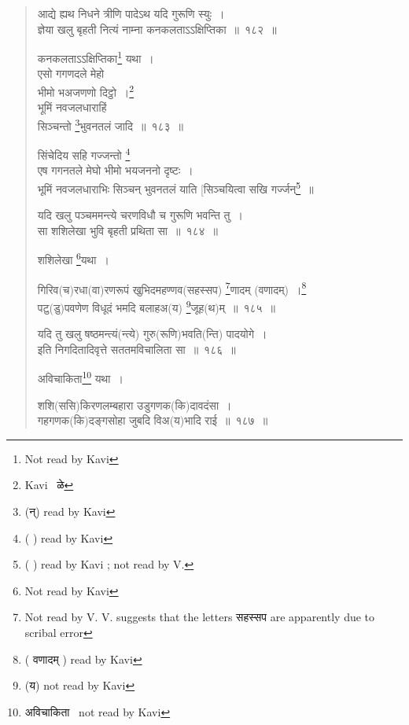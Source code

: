 \documentclass[11pt, openany]{book}
\begin{document}
\begin{quote}
{\na आद्ये ह्यथ निधने त्रीणि पादेऽथ यदि गुरूणि स्युः~।\\
ज्ञेया खलु बृहती नित्यं नाम्ना कनकलताऽऽक्षिप्तिका~॥~१८२~॥

कनकलताऽऽक्षिप्तिका\renewcommand{\thefootnote}{1}\footnote{Not read by Kavi} यथा~। \\
एसो गगणदले मेहो \\
भीमो भअजणणो दिट्ठो~।\renewcommand{\thefootnote}{2}\footnote{Kavi \textendash\ ळे}\\
भूमिं नवजलधाराहिं \\
सिञ्चन्तो \renewcommand{\thefootnote}{3}\footnote{(न्) read by Kavi}भुवनतलं जादि~॥~१८३~॥}

{\qt सिंचेदिय सहि गज्जन्तो \renewcommand{\thefootnote}{4}\footnote{( ) read by Kavi} \\
एष गगनतले मेघो भीमो भयजननो दृष्टः~। \\
भूमिं नवजलधाराभिः सिञ्चन् भुवनतलं याति [सिञ्चयित्वा सखि गर्ज्जन्\renewcommand{\thefootnote}{5}\footnote{( ) read by Kavi ; not read by V.}~॥}

{\na यदि खलु पञ्चममन्त्ये चरणविधौ च गुरूणि भवन्ति तु~। \\
सा शशिलेखा भुवि बृहती प्रथिता सा~॥~१८४~॥}

शशिलेखा \renewcommand{\thefootnote}{6}\footnote{Not read by Kavi}यथा~।

{\na गिरिव(च)रधा(वा)रणरूपं खुभिदमहण्णव(सहस्सप) \renewcommand{\thefootnote}{7}\footnote{Not read by V. V. suggests that the letters सहस्सप are apparently due to scribal error}णादम् (वणादम्)~।\renewcommand{\thefootnote}{8}\footnote{( वणादम् ) read by Kavi}\\
पटु(डु)पवणेण विधूदं भमदि बलाहअ(य) \renewcommand{\thefootnote}{9}\footnote{(य) not read by Kavi}जूह(थ)म्~॥~१८५~॥}

{}

{\na यदि तु खलु षष्ठमन्त्यं(न्त्ये) गुरु(रूणि)भवति(न्ति) पादयोगे~।\\
इति निगदितादिवृत्ते सततमविचालिता सा~॥~१८६~॥}

अविचाकिता\renewcommand{\thefootnote}{10}\footnote{अविचाकिता \textendash\ not read by Kavi} यथा~।

{\na शशि(ससि)किरणलम्बहारा उडुगणक(कि)दावदंसा~। \\
गहगणक(कि)दङ्गसोहा जुबदि विअ(य)भादि राई~॥~१८७~॥}

{ }
\end{quote}
\end{document}

